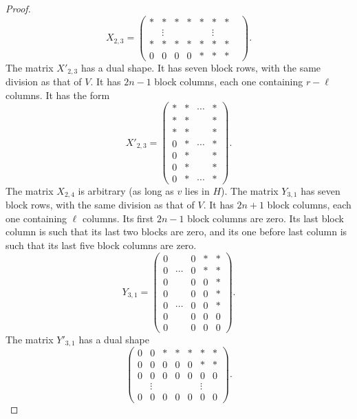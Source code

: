 \documentclass[12pts]{amsart}
\begin{document}
\begin{proof}
\begin{equation}\label{9.29}
X_{2,3}=\begin{pmatrix}\ast&\ast&\ast&\ast&\ast&\ast&\ast\\&\vdots&&&&\vdots&&\\\ast&\ast&\ast&\ast&\ast&\ast&\ast\\0&0&0&0&\ast&\ast&\ast\end{pmatrix}.
\end{equation}
The matrix $X'_{2,3}$ has a dual shape. It has seven block rows, with the same division as that of $V$. It has $2n-1$ block columns, each one containing $r-\ell$ columns. It has the form
\begin{equation}\label{9.30}
X'_{2,3}=\begin{pmatrix}\ast&\ast&\cdots&\ast\\\ast&\ast&&\ast\\\ast&\ast&&\ast\\0&\ast&\cdots&\ast\\0&\ast&&\ast\\0&\ast&&\ast\\0&\ast&\cdots&\ast\end{pmatrix}.
\end{equation}
The matrix $X_{2,4}$ is arbitrary (as long as $v$ lies in $H$). The matrix $Y_{3,1}$ has seven block rows, with the same division as that of $V$. It has $2n+1$ block columns, each one containing $\ell$ columns. Its first $2n-1$ block columns are zero. Its last block column is such that its last two blocks are zero, and its one before last column is such that its last five block columns are zero.
\begin{equation}\label{9.31}
Y_{3,1}=\begin{pmatrix}0&&0&\ast&\ast\\0&\cdots&0&\ast&\ast\\
0&&0&0&\ast\\0&&0&0&\ast\\0&\cdots&0&0&\ast\\0&&0&0&0\\0&&0&0&0\end{pmatrix}.
\end{equation}
The matrix $Y'_{3,1}$ has a dual shape
\begin{equation}\label{9.32}
\begin{pmatrix} 0&0&\ast&\ast&\ast&\ast&\ast\\0&0&0&0&0&\ast&\ast\\0&0&0&0&0&0&0\\&\vdots&&&&\vdots\\0&0&0&0&0&0&0\end{pmatrix}.

\end{equation}
\end{proof}
\end{document}
